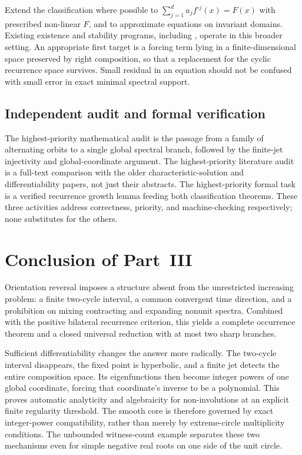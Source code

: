 \documentclass[11pt,letterpaper]{article}
\theoremstyle{definition}
\theoremstyle{remark}
\begin{document}
Extend the classification where possible to
$\sum_{j=1}^d a_jf^{\circ j}(x)=F(x)$ with prescribed non-linear
$F$, and to approximate equations on invariant domains. Existing
existence and stability programs, including \cite{LZ2013,XHWX2026},
operate in this broader setting. An appropriate first target is a
forcing term lying in a finite-dimensional space preserved by right
composition, so that a replacement for the cyclic recurrence space
survives. Small residual in an equation should not be confused with
small error in exact minimal spectral support.

\subsection{Independent audit and formal verification}

The highest-priority mathematical audit is the passage from a family
of alternating orbits to a single global spectral branch, followed by
the finite-jet injectivity and global-coordinate argument. The
highest-priority literature audit is a full-text comparison with the
older characteristic-solution and differentiability papers, not just
their abstracts. The highest-priority formal task is a verified
recurrence growth lemma feeding both classification theorems. These
three activities address correctness, priority, and machine-checking
respectively; none substitutes for the others.

\section{Conclusion of Part~III}
\label{nrr:dc:sec:conclusion}

Orientation reversal imposes a structure absent from the unrestricted
increasing problem: a finite two-cycle interval, a common convergent
time direction, and a prohibition on mixing contracting and expanding
nonunit spectra. Combined with the positive bilateral recurrence
criterion, this yields a complete occurrence theorem and a closed
universal reduction with at most two sharp branches.

Sufficient differentiability changes the answer more radically.
The two-cycle interval disappears, the fixed point is hyperbolic,
and a finite jet detects the entire composition space. Its eigenfunctions
then become integer powers of one global coordinate, forcing that
coordinate's inverse to be a polynomial. This proves automatic
analyticity and algebraicity for non-involutions at an explicit finite
regularity threshold. The smooth core is therefore governed by exact
integer-power compatibility, rather than merely by extreme-circle
multiplicity conditions. The unbounded witness-count example separates
these two mechanisms even for simple negative real roots on one side
of the unit circle.
\end{document}
